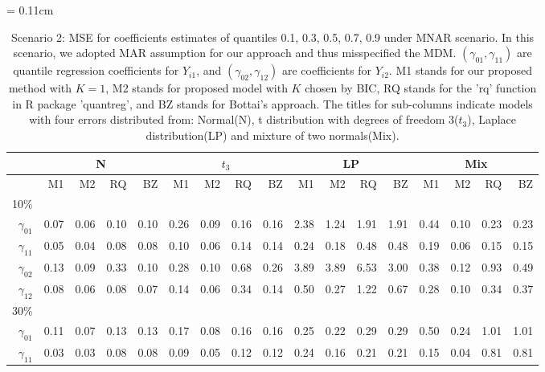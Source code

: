\documentclass[12pt]{article}
\begin{document}
  \begin{table}
\centering
    \caption{Scenario 2: MSE for coefficients estimates of quantiles 0.1, 0.3, 0.5, 0.7, 0.9 under MNAR scenario.
In this scenario, we adopted MAR assumption for our approach and thus misspecified the MDM.
$(\gamma_{01}, \gamma_{11})$ are quantile regression coefficients for $Y_{i1}$, and $(\gamma_{02}, \gamma_{12})$ are coefficients for $Y_{i2}$. M1 stands for our proposed method with $K = 1$, M2 stands for proposed model with $K$ chosen by BIC, RQ stands for the 'rq' function in R package 'quantreg', and BZ stands for Bottai's approach.
The titles for sub-columns indicate models with four errors distributed from: Normal(N), t distribution with degrees of freedom 3($t_3$),
Laplace distribution(LP) and mixture of two normals(Mix).
}\label{tab:sim2}
    \vspace{10pt} \tabcolsep = 0.11cm
    \begin{tabular}{r|rrrr|rrrr|rrrr|rrrr}
      \hline
              & \multicolumn{4}{c|}{N} & \multicolumn{4}{c|}{$t_3$}   & \multicolumn{4}{c|}{LP}   & \multicolumn{4}{c}{Mix}   \\
      \hline
           & M1                      & M2 & RQ & BZ   & M1                      & M2 & RQ & BZ   & M1                      & M2 & RQ & BZ   & M1                      & M2 & RQ & BZ \\
10\%  &&&&&&&&&&&&&&&\\
$\gamma_{01}$ & 0.07 & 0.06 & 0.10 & 0.10 & 0.26 & 0.09 & 0.16 & 0.16 & 2.38 & 1.24 & 1.91 & 1.91 & 0.44 & 0.10 & 0.23 & 0.23 \\
$\gamma_{11}$ & 0.05 & 0.04 & 0.08 & 0.08 & 0.10 & 0.06 & 0.14 & 0.14 & 0.24 & 0.18 & 0.48 & 0.48 & 0.19 & 0.06 & 0.15 & 0.15 \\
$\gamma_{02}$ & 0.13 & 0.09 & 0.33 & 0.10 & 0.28 & 0.10 & 0.68 & 0.26 & 3.89 & 3.89 & 6.53 & 3.00 & 0.38 & 0.12 & 0.93 & 0.49 \\
$\gamma_{12}$ & 0.08 & 0.06 & 0.08 & 0.07 & 0.14 & 0.06 & 0.34 & 0.14 & 0.50 & 0.27 & 1.22 & 0.67 & 0.28 & 0.10 & 0.34 & 0.37 \\
30\% &&&&&&&&&&&&&&&\\
$\gamma_{01}$ & 0.11 & 0.07 & 0.13 & 0.13 & 0.17 & 0.08 & 0.16 & 0.16 & 0.25 & 0.22 & 0.29 & 0.29 & 0.50 & 0.24 & 1.01 & 1.01 \\
$\gamma_{11}$ & 0.03 & 0.03 & 0.08 & 0.08 & 0.09 & 0.05 & 0.12 & 0.12 & 0.24 & 0.16 & 0.21 & 0.21 & 0.15 & 0.04 & 0.81 & 0.81 \\

\end{tabular}
\end{table}
\end{document}
